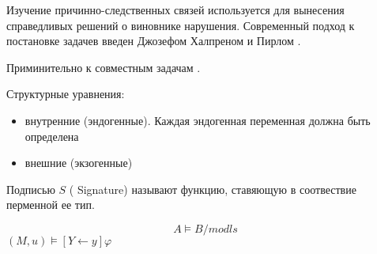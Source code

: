 Изучение причинно-следственных связей
используется для вынесения справедливых
решений о виновнике нарушения. 
Современный подход к постановке задачев
введен Джозефом Халпреном и Пирлом 
\cite{halpern2005causes} \cite{halpern2005explanations}.

Приминительно к совместным задачам \cite{aier2021game}.

Структурные уравнения:

\begin{itemize}
    \item внутренние (эндогенные). Каждая эндогенная переменная должна быть определена 
    \item внешние (экзогенные)
\end{itemize}

Подписью $S$ ( Signature) называют
функцию, ставяющую в соотвествие перменной ее тип.

$$
    A \models B /modls
$$
$(M, u) \models [Y \gets y]\varphi$

\cite{alechina2020causality}